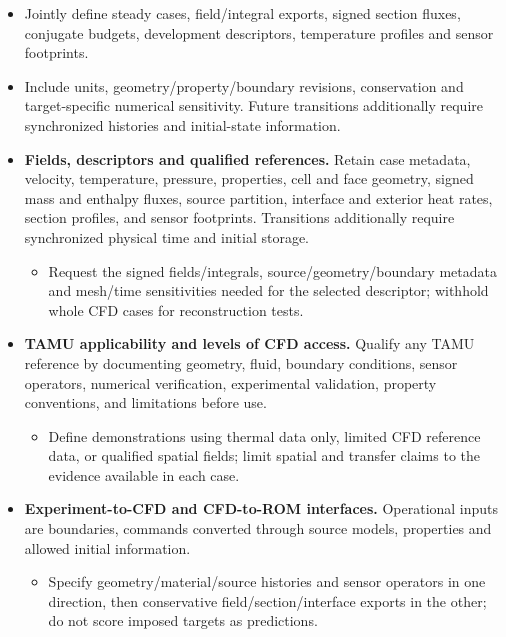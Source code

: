 \begin{itemize}[leftmargin=*]
\item Jointly define steady cases, field/\allowbreak{}integral exports, signed section fluxes, conjugate budgets, development descriptors, temperature profiles and sensor footprints.
\item Include units, geometry/\allowbreak{}property/\allowbreak{}boundary revisions, conservation and target-specific numerical sensitivity. Future transitions additionally require synchronized histories and initial-state information.

\item {}\textbf{Fields, descriptors and qualified references.} Retain case metadata, velocity, temperature, pressure, properties, cell and face geometry, signed mass and enthalpy fluxes, source partition, interface and exterior heat rates, section profiles, and sensor footprints. Transitions additionally require synchronized physical time and initial storage.
\begin{itemize}
\item Request the signed fields/\allowbreak{}integrals, source/\allowbreak{}geometry/\allowbreak{}boundary metadata and mesh/\allowbreak{}time sensitivities needed for the selected descriptor; withhold whole CFD cases for reconstruction tests.
\end{itemize}
\item {}\textbf{TAMU applicability and levels of CFD access.} Qualify any TAMU reference by documenting geometry, fluid, boundary conditions, sensor operators, numerical verification, experimental validation, property conventions, and limitations before use.
\begin{itemize}
\item Define demonstrations using thermal data only, limited CFD reference data, or qualified spatial fields; limit spatial and transfer claims to the evidence available in each case.
\end{itemize}
\item {}\textbf{Experiment-to-CFD and CFD-to-ROM interfaces.} Operational inputs are boundaries, commands converted through source models, properties and allowed initial information.
\begin{itemize}
\item Specify geometry/\allowbreak{}material/\allowbreak{}source histories and sensor operators in one direction, then conservative field/\allowbreak{}section/\allowbreak{}interface exports in the other; do not score imposed targets as predictions.

\end{itemize}
\end{itemize}
